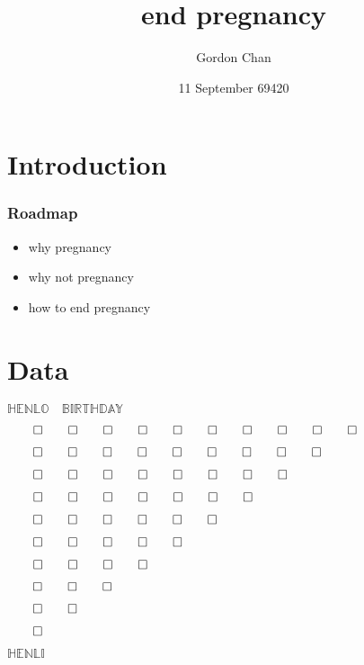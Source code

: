 \documentclass{beamer}
\title{end pregnancy}
\author{Gordon Chan}
\date{11 September 69420}
\begin{document}
\maketitle
\section{Introduction}
\begin{frame}
    \frametitle{Roadmap}
    \begin{itemize}
        \item why pregnancy\pause{}
        \item why not pregnancy\pause{}
        \item how to end pregnancy
    \end{itemize}
\end{frame}
\section{Data}
\begin{frame}
    \begin{center}
        $\boxed{\mathbb{HENLO\quad BIRTHDAY}}$

$\qed\qed\qed\qed\qed\qed\qed\qed\qed\qed$

$\qed\qed\qed\qed\qed\qed\qed\qed\qed$

$\qed\qed\qed\qed\qed\qed\qed\qed$

$\qed\qed\qed\qed\qed\qed\qed$

$\qed\qed\qed\qed\qed\qed$

$\qed\qed\qed\qed\qed$

$\qed\qed\qed\qed$

$\qed\qed\qed$

$\qed\qed$

$\qed$

$\boxed{\mathbb{HENLI}}$
   \end{center}
\end{frame}
\end{document}
